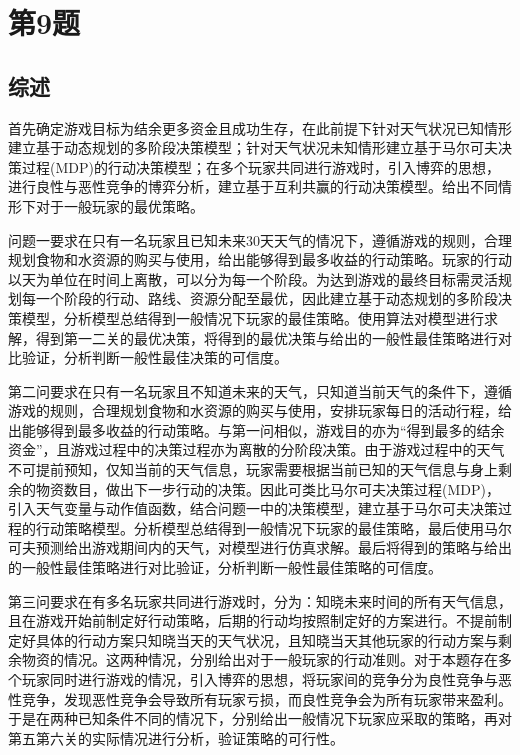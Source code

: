 \documentclass[UTF8]{article}
\begin{document}
\section*{第9题}
\subsection*{综述}
首先确定游戏目标为结余更多资金且成功生存，在此前提下针对天气状况已知情形建立基于动态规划的多阶段决策模型；针对天气状况未知情形建立基于马尔可夫决策过程(MDP)的行动决策模型；在多个玩家共同进行游戏时，引入博弈的思想，进行良性与恶性竞争的博弈分析，建立基于互利共赢的行动决策模型。给出不同情形下对于一般玩家的最优策略。

问题一要求在只有一名玩家且已知未来30天天气的情况下，遵循游戏的规则，合理规划食物和水资源的购买与使用，给出能够得到最多收益的行动策略。玩家的行动以天为单位在时间上离散，可以分为每一个阶段。为达到游戏的最终目标需灵活规划每一个阶段的行动、路线、资源分配至最优，因此建立基于动态规划的多阶段决策模型，分析模型总结得到一般情况下玩家的最佳策略。使用算法对模型进行求解，得到第一二关的最优决策，将得到的最优决策与给出的一般性最佳策略进行对比验证，分析判断一般性最佳决策的可信度。

第二问要求在只有一名玩家且不知道未来的天气，只知道当前天气的条件下，遵循游戏的规则，合理规划食物和水资源的购买与使用，安排玩家每日的活动行程，给出能够得到最多收益的行动策略。与第一问相似，游戏目的亦为“得到最多的结余资金”，且游戏过程中的决策过程亦为离散的分阶段决策。由于游戏过程中的天气不可提前预知，仅知当前的天气信息，玩家需要根据当前已知的天气信息与身上剩余的物资数目，做出下一步行动的决策。因此可类比马尔可夫决策过程(MDP)，引入天气变量与动作值函数，结合问题一中的决策模型，建立基于马尔可夫决策过程的行动策略模型。分析模型总结得到一般情况下玩家的最佳策略，最后使用马尔可夫预测给出游戏期间内的天气，对模型进行仿真求解。最后将得到的策略与给出的一般性最佳策略进行对比验证，分析判断一般性最佳策略的可信度。

第三问要求在有多名玩家共同进行游戏时，分为：知晓未来时间的所有天气信息，且在游戏开始前制定好行动策略，后期的行动均按照制定好的方案进行。不提前制定好具体的行动方案只知晓当天的天气状况，且知晓当天其他玩家的行动方案与剩余物资的情况。这两种情况，分别给出对于一般玩家的行动准则。对于本题存在多个玩家同时进行游戏的情况，引入博弈的思想，将玩家间的竞争分为良性竞争与恶性竞争，发现恶性竞争会导致所有玩家亏损，而良性竞争会为所有玩家带来盈利。于是在两种已知条件不同的情况下，分别给出一般情况下玩家应采取的策略，再对第五第六关的实际情况进行分析，验证策略的可行性。
\end{document}
